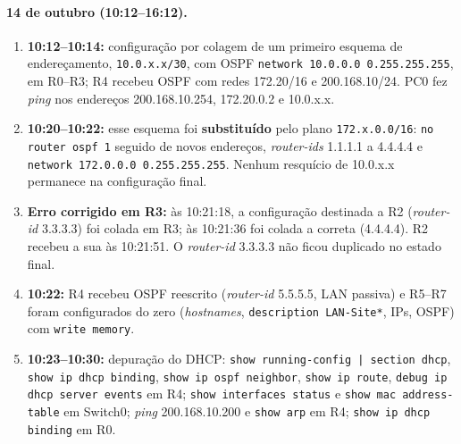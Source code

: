 \documentclass[12pt,a4paper]{article}
\begin{document}
\paragraph{14 de outubro (10:12--16:12).}
\begin{enumerate}[nosep]
\item \textbf{10:12--10:14:} configuração por colagem de um primeiro esquema de endereçamento, \texttt{10.0.x.x/30}, com OSPF \texttt{network 10.0.0.0 0.255.255.255}, em R0--R3; R4 recebeu OSPF com redes 172.20/16 e 200.168.10/24. PC0 fez \textit{ping} nos endereços 200.168.10.254, 172.20.0.2 e 10.0.x.x.
\item \textbf{10:20--10:22:} esse esquema foi \textbf{substituído} pelo plano \texttt{172.x.0.0/16}: \texttt{no router ospf 1} seguido de novos endereços, \textit{router-ids} 1.1.1.1 a 4.4.4.4 e \texttt{network 172.0.0.0 0.255.255.255}. Nenhum resquício de 10.0.x.x permanece na configuração final.
\item \textbf{Erro corrigido em R3:} às 10:21:18, a configuração destinada a R2 (\textit{router-id} 3.3.3.3) foi colada em R3; às 10:21:36 foi colada a correta (4.4.4.4). R2 recebeu a sua às 10:21:51. O \textit{router-id} 3.3.3.3 não ficou duplicado no estado final.
\item \textbf{10:22:} R4 recebeu OSPF reescrito (\textit{router-id} 5.5.5.5, LAN passiva) e R5--R7 foram configurados do zero (\textit{hostnames}, \texttt{description LAN-Site*}, IPs, OSPF) com \texttt{write memory}.
\item \textbf{10:23--10:30:} depuração do DHCP: \texttt{show running-config | section dhcp}, \texttt{show ip dhcp binding}, \texttt{show ip ospf neighbor}, \texttt{show ip route}, \texttt{debug ip dhcp server events} em R4; \texttt{show interfaces status} e \texttt{show mac address-table} em Switch0; \textit{ping} 200.168.10.200 e \texttt{show arp} em R4; \texttt{show ip dhcp binding} em R0.
\end{enumerate}
\end{document}
